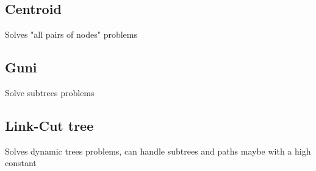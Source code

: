 \subsection{Centroid }

Solves "all pairs of nodes" problems

\subsection{Guni }

Solve subtrees problems

\subsection{Link-Cut tree }

Solves dynamic trees problems, can handle subtrees and paths maybe with a high constant
